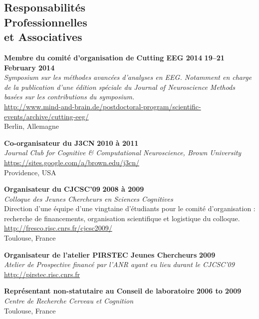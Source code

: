 \documentclass[margin,line]{resume}
\begin{document}
\begin{resume}
\vspace{3mm}
    \section{\mysidestyle Responsabilités\\ Professionnelles\\ et Associatives}

	\textbf{Membre du comité d'organisation de Cutting EEG 2014} \hfill \textbf{19--21 February 2014}\\
	\textsl{Symposium sur les méthodes avancées d'analyses en EEG. Notamment en charge de la publication d'une édition spéciale du Journal of Neuroscience Methods basées sur les contributions du symposium.}\\
	 \url{http://www.mind-and-brain.de/postdoctoral-program/scientific-events/archive/cutting-eeg/}\\
	Berlin, Allemagne
	
	\vspace{-2mm} 
	\textbf{Co-organisateur du J3CN} \hfill \textbf{2010 à 2011}\\
	\textsl{Journal Club for Cognitive \& Computational Neuroscience, Brown University}\\
	 \url{https://sites.google.com/a/brown.edu/j3cn/}\\
	Providence, USA	

	\vspace{-2mm} 
	\textbf{Organisateur du CJCSC'09} \hfill \textbf{2008 à 2009}\\
	\textsl{Colloque des Jeunes Chercheurs en Sciences Cognitives}\\
	Direction d'une équipe d'une vingtaine d'étudiants pour le comité d'organisation : recherche de financements, organisation scientifique et logistique du colloque.\\
	 \url{http://fresco.risc.cnrs.fr/cjcsc2009/}\\
	Toulouse, France	

	\vspace{-2mm} 
	\textbf{Organisateur de l'atelier PIRSTEC Jeunes Chercheurs} \hfill \textbf{2009}\\
	\textsl{Atelier de Prospective financé par l'ANR ayant eu lieu durant le CJCSC'09}\\
	\url{http://pirstec.risc.cnrs.fr}

\newpage

	\vspace{-2mm} 
	\textbf{Représentant non-statutaire au Conseil de laboratoire} \hfill \textbf{2006 to 2009}\\
	\textsl{Centre de Recherche Cerveau et Cognition}\\
	Toulouse, France	


\end{resume}
\end{document}
